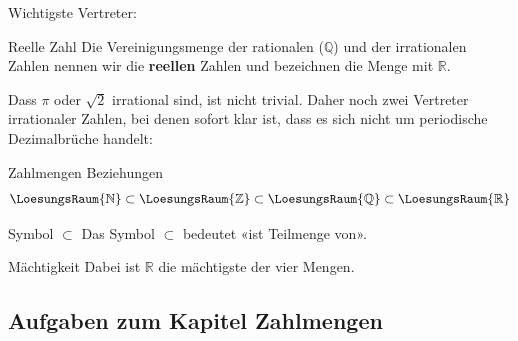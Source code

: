 Wichtigste Vertreter:


\begin{definition}{Reelle Zahl}{}
Die Vereinigungsmenge der rationalen ($\mathbb{Q}$) und der irrationalen Zahlen
nennen wir die \textbf{reellen} Zahlen und bezeichnen die Menge mit $\mathbb{R}$.
\end{definition}


Dass $\pi$ oder $\sqrt{2}$ irrational sind, ist nicht trivial. Daher
noch zwei Vertreter irrationaler Zahlen, bei denen sofort klar ist,
dass es sich nicht um periodische Dezimalbrüche handelt:


\begin{gesetz}{Zahlmengen Beziehungen}{}
$$\LoesungsRaum{\mathbb{N}} \subset \LoesungsRaum{\mathbb{Z}} \subset
  \LoesungsRaum{\mathbb{Q}} \subset \LoesungsRaum{\mathbb{R}} $$%
\end{gesetz}


\begin{bemerkung}{Symbol $\subset$}{}
  Das Symbol $\subset$ bedeutet «ist Teilmenge von».
\end{bemerkung}

\begin{bemerkung}{Mächtigkeit}{}
  Dabei ist $\mathbb{R}$ die mächtigste der vier Mengen. 
\end{bemerkung}



\subsection*{Aufgaben zum Kapitel Zahlmengen}


